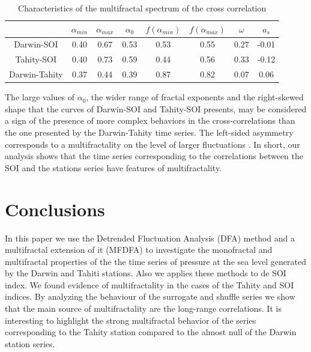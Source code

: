 \documentclass[onecolumn, preprint,aps,amsmath, amssymb, superscriptaddress]{revtex4}
\begin{document}
\begin{table}[t]
\begin{center}
\begin{tabular}{ c  c  c  c  c  c  c  c }
\hline

   & $\alpha_{min}$  & $\alpha_{max}$ & $\alpha_0$ & $f(\alpha_{min})$ & $f(\alpha_{max})$ & $\omega$& $a_s$ \\ \hline
Darwin-SOI   & 0.40  & 0.67  & 0.53  & 0.53 &  0.55 &  0.27 &  -0.01 \\
Tahity-SOI     & 0.40  & 0.73  & 0.59  & 0.44 &  0.56 &  0.33 &  -0.12 \\
Darwin-Tahity     & 0.37  & 0.44  & 0.39  & 0.87 &  0.82 &  0.07 &  0.06 \\
\hline
\end{tabular}
\caption{Characteristics of the multifractal spectrum of the cross correlation}
\label{tab:mfdcca}
\end{center}
\end{table}

The large values of $\alpha_0$, the wider range of fractal exponents and the right-skewed shape that the curves of Darwin-SOI and Tahity-SOI presents,  may be considered a sign of the presence of more complex behaviors in the cross-correlations than the one presented by the Darwin-Tahity time series. The left-sided asymmetry corresponds to a multifractality on the level of larger fluctuations
.
In short, our analysis shows that the time series corresponding to the correlations between the SOI and the stations series have features of multifractality.

\section{Conclusions}
\label{sec:conclusions}

In this paper we use the Detrended Fluctuation Analysis (DFA) method and a multifractal extension of it (MFDFA) to investigate the monofractal and multifractal properties of the the time series of pressure at the sea level generated by the Darwin and Tahiti stations. Also we applies these methods to de SOI index. We found evidence of multifractality in the cases of the Tahity and SOI indices. By analyzing the behaviour of the surrogate and shuffle series we show that the main source of multifractality are the long-range correlations. It is interesting to highlight the strong multifractal behavior of the series corresponding to the Tahity station compared to the almost null of the Darwin station series.
\end{document}
